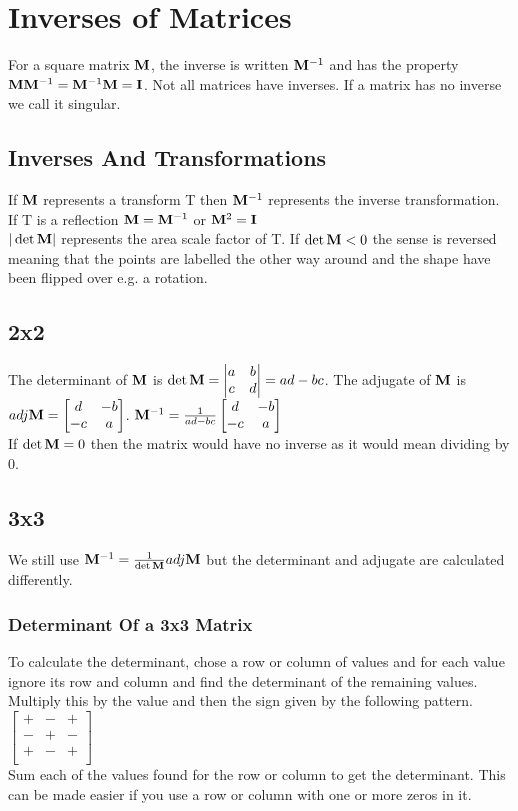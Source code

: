 \documentclass[class=article, crop=false]{standalone}
\begin{document}
\section*{Inverses of Matrices}
For a square matrix $\bold{M}$, the inverse is written $\bold{M}^{-1}$ and has the property $\bold{M}\bold{M}^{-1} = \bold{M}^{-1}\bold{M} = \bold{I}$. Not all matrices have inverses. If a matrix has no inverse we call it singular.
\subsection*{Inverses And Transformations}
If $\bold{M}$ represents a transform T then $\bold{M}^{-1}$ represents the inverse transformation. If T is a reflection $\bold{M} = \bold{M}^{-1}$ or $\bold{M}^2 = \bold{I}$ \\
$|\det \bold{M}|$ represents the area scale factor of T. If $\det \bold{M} < 0$ the sense is reversed meaning that the points are labelled the other way around and the shape have been flipped over e.g. a rotation. 
\subsection*{2x2}
The determinant of $\bold{M}$ is $\det \bold{M} = \begin{vmatrix} a & b \\ c & d \end{vmatrix} = ad-bc$. The adjugate of $\bold{M}$ is $adj \bold{M} = \begin{bmatrix} d & -b \\ -c & a \end{bmatrix}$. $\bold{M}^{-1} = \frac{1}{ad-bc} \begin{bmatrix} d & -b \\ -c & a \end{bmatrix}$ \\
If $\det \bold{M} = 0$ then the matrix would have no inverse as it would mean dividing by 0. 

\subsection*{3x3}
We still use $\bold{M}^{-1} = \frac{1}{\det \bold{M}} adj \bold{M}$ but the determinant and adjugate are calculated differently.
\subsubsection*{Determinant Of a 3x3 Matrix}
To calculate the determinant, chose a row or column of values and for each value ignore its row and column and find the determinant of the remaining values. Multiply this by the value and then the sign given by the following pattern. \\ 
$\begin{bmatrix}
+ & - & + \\
- & + & - \\
+ & - & + \\
\end{bmatrix} $ \\
Sum each of the values found for the row or column to get the determinant. This can be made easier if you use a row or column with one or more zeros in it. 
\end{document}
